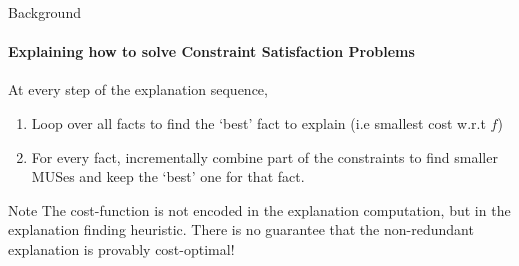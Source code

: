 \documentclass[handout]{beamer}
\begin{document}
	\begin{frame}{Background}
	\framesubtitle{Explaining how to solve Constraint Satisfaction Problems}
	At every step of the explanation sequence,
	\begin{enumerate}
		\item Loop over all facts to find the `best' fact to explain (i.e smallest cost w.r.t $f$)
		\item For every fact, incrementally combine part of the constraints to find smaller MUSes and keep the `best' one for that fact.
	\end{enumerate}\pause

	\begin{alertblock}{Note}
		The cost-function is not encoded in the explanation computation, but in the explanation finding heuristic. There is no guarantee that the non-redundant explanation is provably cost-optimal!
	\end{alertblock}
			
	\end{frame}

%	


%	
%		

%	
%	
\end{document}
